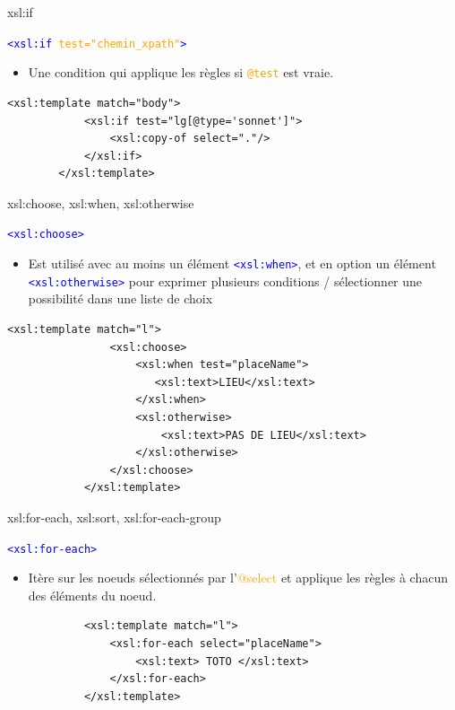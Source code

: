 \begin{frame}[fragile]{xsl:if}
    \begin{block}{\textcolor{blue}{\texttt{<xsl:if \textcolor{orange}{test="chemin\_xpath"}>}}}
    \begin{itemize}
        \item Une condition qui applique les règles si \textcolor{orange}{\texttt{@test}} est vraie.
    \end{itemize}
    \begin{lstlisting}[numbers=none]
        <xsl:template match="body">
            <xsl:if test="lg[@type='sonnet']">
                <xsl:copy-of select="."/>
            </xsl:if>
        </xsl:template>
    \end{lstlisting}
        
    \end{block}
\end{frame}

\begin{frame}[fragile]{xsl:choose, xsl:when, xsl:otherwise}
    \begin{block}{\textcolor{blue}{\texttt{<xsl:choose>}}}
        \begin{itemize}
            \item Est utilisé avec au moins un élément \textcolor{blue}{\texttt{<xsl:when>}}, et en option un élément \textcolor{blue}{\texttt{<xsl:otherwise>}} pour exprimer plusieurs conditions / sélectionner une possibilité dans une liste de choix
        \end{itemize}
    
        \begin{lstlisting}[numbers=none]
            <xsl:template match="l">
                <xsl:choose>
                    <xsl:when test="placeName">
                       <xsl:text>LIEU</xsl:text>
                    </xsl:when>
                    <xsl:otherwise>
                        <xsl:text>PAS DE LIEU</xsl:text>
                    </xsl:otherwise>
                </xsl:choose>
            </xsl:template>
        \end{lstlisting}
        
    \end{block}
\end{frame}

\begin{frame}[fragile]{xsl:for-each, xsl:sort, xsl:for-each-group}
    \begin{block}{\textcolor{blue}{\texttt{<xsl:for-each>}}}
        \begin{itemize}
            \item Itère sur les noeuds sélectionnés par l'\textcolor{orange}{@select} et applique les règles à chacun des éléments du noeud.
        \end{itemize}

        \begin{lstlisting}
            <xsl:template match="l">
                <xsl:for-each select="placeName">
                    <xsl:text> TOTO </xsl:text>
                </xsl:for-each>
            </xsl:template>
        \end{lstlisting}
    \end{block}
\end{frame}


